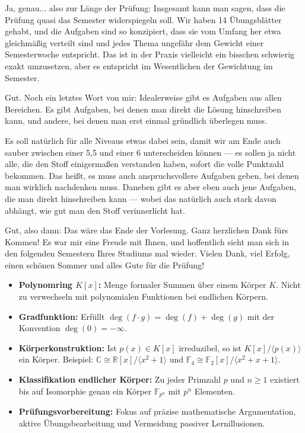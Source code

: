 \begin{spoken-clean}[01:28:09 - 01:29:21]
Ja, genau... also zur Länge der Prüfung: Insgesamt kann man sagen, dass die Prüfung quasi das Semester widerspiegeln soll. Wir haben 14 Übungsblätter gehabt, und die Aufgaben sind so konzipiert, dass sie vom Umfang her etwa gleichmäßig verteilt sind und jedes Thema ungefähr dem Gewicht einer Semesterwoche entspricht. Das ist in der Praxis vielleicht ein bisschen schwierig exakt umzusetzen, aber es entspricht im Wesentlichen der Gewichtung im Semester.

Gut. Noch ein letztes Wort von mir: Idealerweise gibt es Aufgaben aus allen Bereichen. Es gibt Aufgaben, bei denen man direkt die Lösung hinschreiben kann, und andere, bei denen man erst einmal gründlich überlegen muss.

Es soll natürlich für alle Niveaus etwas dabei sein, damit wir am Ende auch sauber zwischen einer 5,5 und einer 6 unterscheiden können --- es sollen ja nicht alle, die den Stoff einigermaßen verstanden haben, sofort die volle Punktzahl bekommen. Das heißt, es muss auch anspruchsvollere Aufgaben geben, bei denen man wirklich nachdenken muss. Daneben gibt es aber eben auch jene Aufgaben, die man direkt hinschreiben kann --- wobei das natürlich auch stark davon abhängt, wie gut man den Stoff verinnerlicht hat.

Gut, also dann: Das wäre das Ende der Vorlesung. Ganz herzlichen Dank fürs Kommen! Es war mir eine Freude mit Ihnen, und hoffentlich sieht man sich in den folgenden Semestern Ihres Studiums mal wieder. Vielen Dank, viel Erfolg, einen schönen Sommer und alles Gute für die Prüfung! 
\end{spoken-clean}

\begin{nice-box}
\begin{itemize}
    \item \textbf{Polynomring $K[x]$:} Menge formaler Summen über einem Körper $K$. Nicht zu verwechseln mit polynomialen Funktionen bei endlichen Körpern.
    \item \textbf{Gradfunktion:} Erfüllt $\deg(f \cdot g) = \deg(f) + \deg(g)$ mit der Konvention $\deg(0) = -\infty$.
    \item \textbf{Körperkonstruktion:} Ist $p(x) \in K[x]$ irreduzibel, so ist $K[x]/\langle p(x) \rangle$ ein Körper. Beispiel: $\mathbb{C} \cong \mathbb{R}[x]/\langle x^2+1 \rangle$ und $\mathbb{F}_4 \cong \mathbb{F}_2[x]/\langle x^2+x+1 \rangle$.
    \item \textbf{Klassifikation endlicher Körper:} Zu jeder Primzahl $p$ und $n \ge 1$ existiert bis auf Isomorphie genau ein Körper $\mathbb{F}_{p^n}$ mit $p^n$ Elementen.
    \item \textbf{Prüfungsvorbereitung:} Fokus auf präzise mathematische Argumentation, aktive Übungsbearbeitung und Vermeidung passiver Lernillusionen.
\end{itemize}
\end{nice-box}